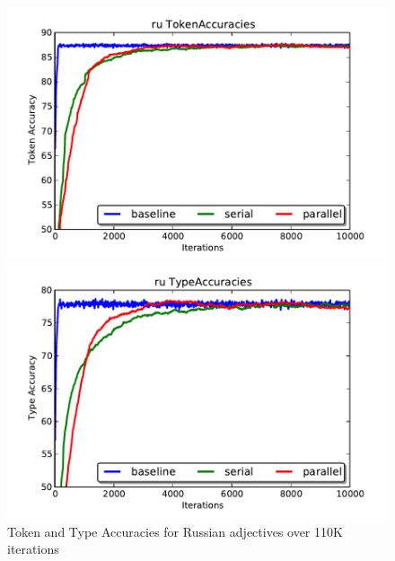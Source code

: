 \begin{figure}[ht]
\begin{minipage}[b]{0.45\linewidth}
\centering
\includegraphics[width=\textwidth]{fig/ru_TokenAccuracies}
\end{minipage}
\hspace{0.5cm}
\begin{minipage}[b]{0.45\linewidth}
\centering
\includegraphics[width=\textwidth]{fig/ru_TypeAccuracies}
\end{minipage}
\caption{\label{fig:ruacc}Token and Type Accuracies for Russian adjectives over 110K iterations}
\end{figure}


